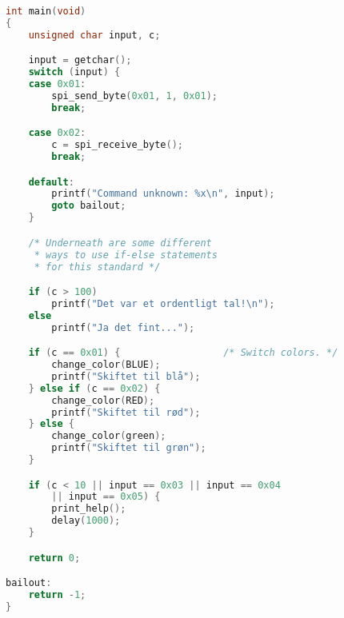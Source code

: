 \documentclass[article, 10pt]{memoir}
\begin{document}
\begin{landscape}
\begin{multicols}{2}
\begin{lstlisting}[language=c]
int main(void)
{
    unsigned char input, c;

    input = getchar();
    switch (input) {
    case 0x01:
        spi_send_byte(0x01, 1, 0x01);
        break;

    case 0x02:
        c = spi_receive_byte();
        break;

    default:
        printf("Command unknown: %x\n", input);
        goto bailout;
    }

    /* Underneath are some different 
     * ways to use if-else statements
     * for this standard */

    if (c > 100)
        printf("Det var et ordentligt tal!\n");
    else
        printf("Ja det fint...");

    if (c == 0x01) {                  /* Switch colors. */
        change_color(BLUE);
        printf("Skiftet til blå");
    } else if (c == 0x02) {
        change_color(RED);
        printf("Skiftet til rød");
    } else {
        change_color(green);
        printf("Skiftet til grøn");
    }

    if (c < 10 || input == 0x03 || input == 0x04
        || input == 0x05) {
        print_help();
        delay(1000);
    }

    return 0;

bailout:
    return -1;
}
        \end{lstlisting}
    \end{multicols}
\end{landscape}
\end{document}
